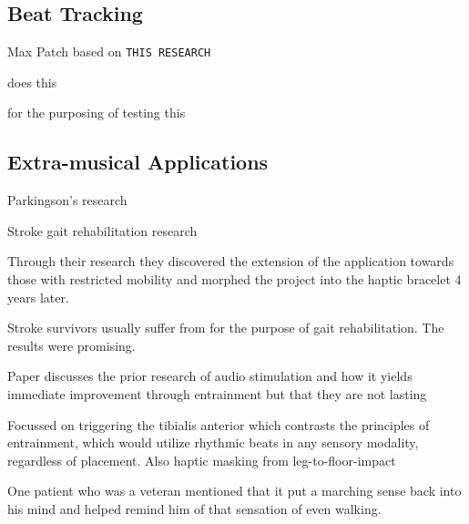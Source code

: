 
\subsection{Beat Tracking}

Max Patch based on \verb!THIS RESEARCH! 

does this

for the purposing of testing this

\subsection{Extra-musical Applications}

Parkingson's research

Stroke gait rehabilitation research \cite{holland2014gait}

Through their research they discovered the extension of the application towards those with restricted mobility and morphed the project into the haptic bracelet 4 years later.

Stroke survivors usually suffer from  for the purpose of gait rehabilitation. The results were promising. 

Paper discusses the prior research of audio stimulation and how it yields immediate improvement through entrainment but that they are not lasting

Focussed on triggering the tibialis anterior which contrasts the principles of entrainment, which would utilize rhythmic beats in any sensory modality, regardless of placement. Also haptic masking from leg-to-floor-impact

One patient who was a veteran mentioned that it put a marching sense back into his mind and helped remind him of that sensation of even walking.
